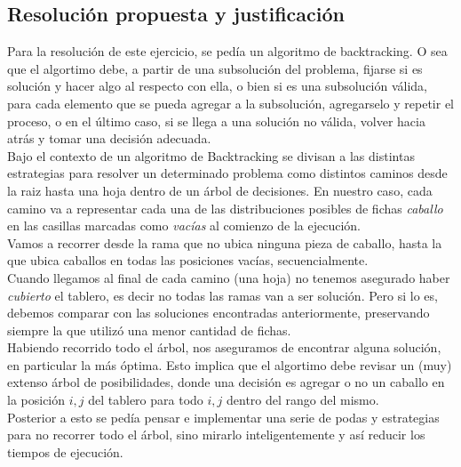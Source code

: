 \newpage

\subsection{Resoluci\'on propuesta y justificaci\'on}
Para la resoluci\'on de este ejercicio, se ped\'ia un algoritmo de backtracking. O sea que el algortimo debe, a partir de una subsoluci\'on del problema, fijarse si es soluci\'on y hacer algo  al respecto con ella, o bien si es una subsoluci\'on v\'alida, para cada elemento que se pueda agregar a la subsoluci\'on, agregarselo y repetir el proceso, o en el \'ultimo caso, si se llega a una soluci\'on no v\'alida, volver hacia atr\'as y tomar una decisi\'on adecuada.\\

Bajo el contexto de un algoritmo de Backtracking se divisan a las distintas estrategias para resolver un determinado problema como distintos caminos desde la raiz hasta una hoja dentro de un \'arbol de decisiones. En nuestro caso, cada camino va a representar cada una de las distribuciones posibles de fichas \emph{caballo} en las casillas marcadas como \emph{vac\'ias} al comienzo de la ejecuci\'on.\\

Vamos a recorrer desde la rama que no ubica ninguna pieza de caballo, hasta la que ubica caballos en todas las posiciones vac\'ias, secuencialmente.\\

Cuando llegamos al final de cada camino (una hoja) no tenemos asegurado haber \emph{cubierto} el tablero, es decir no todas las ramas van a ser soluci\'on. Pero si lo es, debemos comparar con las soluciones encontradas anteriormente, preservando siempre la que utiliz\'o una menor cantidad de fichas.\\

Habiendo recorrido todo el \'arbol, nos aseguramos de encontrar alguna soluci\'on, en particular la m\'as \'optima. Esto implica que el algortimo debe revisar un (muy) extenso \'arbol de posibilidades, donde una decisi\'on es agregar o no un caballo en la posici\'on $i, j$ del tablero para todo $i, j$ dentro del rango del mismo. \\

Posterior a esto se ped\'ia pensar e implementar una serie de podas y estrategias para no recorrer todo el \'arbol, sino mirarlo inteligentemente y as\'i reducir los tiempos de ejecuci\'on.\\


